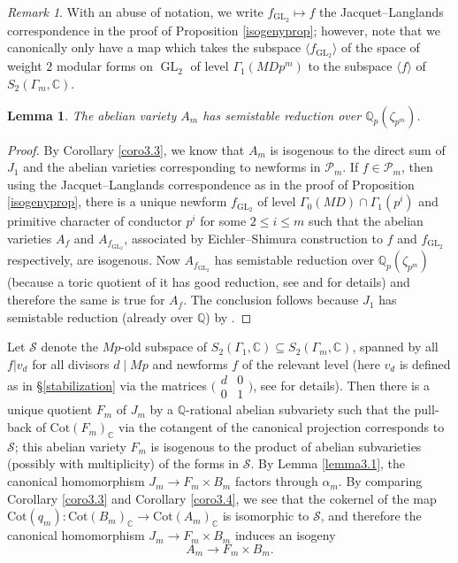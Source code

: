 \documentclass[a4paper,11pt]{amsart}
\numberwithin{equation}{section}
\theoremstyle{plain}
\newtheorem{lemma}[theorem]{Lemma}
\theoremstyle{definition}
\theoremstyle{remark}
\newtheorem{remark}[theorem]{Remark}
\newcommand{\Q}{\mathbb{Q}}
\newcommand{\C}{\mathbb{C}}
\DeclareMathOperator{\GL}{GL}
\newcommand{\Cot}{\mathrm{Cot}}
\newcommand{\smallmat}[4]{\bigl(\begin{smallmatrix}#1&#2\\#3&#4\end{smallmatrix}\bigr)}
\begin{document}
\begin{remark} With an abuse of notation, we write $f_\mathrm{GL_2}\mapsto f$ the Jacquet--Langlands correspondence in the proof of Proposition \ref{isogenyprop}; however, note that we canonically 
only have a map which takes the subspace $\langle f_\mathrm{GL_2}\rangle $ of the space of weight $2$ modular forms on $\GL_2$ of level $\Gamma_1(MDp^m)$ to the subspace $\langle f\rangle$ of $S_2(\Gamma_m,\C)$.
\end{remark}

\begin{lemma} 
The abelian variety $A_m$ has semistable reduction over $\Q_p(\zeta_{p^m})$.
\end{lemma}
\begin{proof} 
By Corollary \ref{coro3.3}, we know that $A_m$ is isogenous to the direct sum of  
$J_1$ and the abelian varieties corresponding to newforms in $\mathcal{P}_m$. If $f\in \mathcal{P}_m$, then using the Jacquet--Langlands correspondence as in the proof of Proposition \ref{isogenyprop}, there is a unique newform $f_\mathrm{GL_2}$ of level $\Gamma_0(MD)\cap\Gamma_1(p^i)$ and primitive character of conductor $p^i$ for some $2\leq i\leq m$ such that the abelian varieties $A_f$ and $A_{f_\mathrm{GL_2}}$, associated by Eichler--Shimura construction 
to $f$ and $f_\mathrm{GL_2}$ respectively, are isogenous. Now $A_{f_\mathrm{GL_2}}$ has semistable reduction over $\Q_p(\zeta_{p^m})$ (because a toric quotient of it has good reduction, see  
\cite[Chapter 3, Section 2, Proposition 1]{MW} and \cite[page 562]{OhtaMA} for details) and therefore the same is true for $A_f$. The conclusion follows because $J_1$ has semistable reduction (already over $\Q$) by \cite[Theorem 4.10]{Buz}.  
\end{proof}

Let $\mathcal{S}$ denote the $Mp$-old subspace of $S_2(\Gamma_1,\C)\subseteq S_2(\Gamma_m,\C)$,  
spanned by all $f|v_d$ for all divisors $d\mid Mp$ and newforms $f$ of the relevant level (here $v_d$ is defined 
as in \S\ref{stabilization} via the matrices $\smallmat d001$, see \cite[\S2.1]{Hijikata} for details). 
Then there is a unique quotient $F_m$ of $J_m$ by a $\Q$-rational abelian subvariety such that the pull-back of $\Cot(F_m)_\C$ via the cotangent of the canonical projection corresponds to $\mathcal{S}$; this abelian variety $F_m$ is isogenous to the product of abelian subvarieties (possibly with multiplicity) of the forms in $\mathcal{S}$. By Lemma \ref{lemma3.1}, the canonical homomorphism $J_m\rightarrow F_m\times B_m$ factors through $\alpha_m$. By comparing Corollary \ref{coro3.3} and Corollary \ref{coro3.4}, we see that the cokernel of the map $\Cot(q_m)\colon 
\Cot(B_m)_\C\rightarrow\Cot(A_m)_\C$ is isomorphic to $\mathcal{S}$, and therefore the canonical homomorphism $J_m\rightarrow F_m\times B_m$
induces an isogeny \begin{equation}\label{isogeny}
A_m\longrightarrow F_m\times B_m.\end{equation} 
\end{document}
